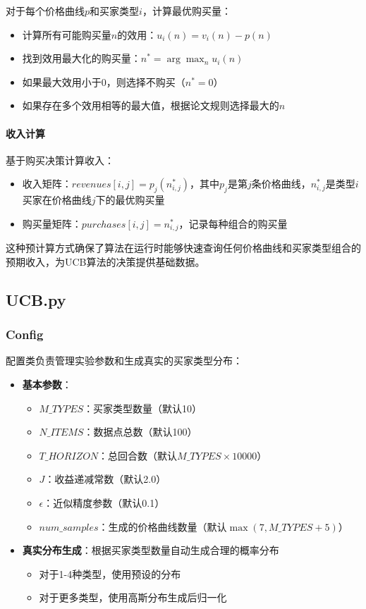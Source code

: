 对于每个价格曲线$p$和买家类型$i$，计算最优购买量：

\begin{itemize}
    \item 计算所有可能购买量$n$的效用：$u_i(n) = v_i(n) - p(n)$
    \item 找到效用最大化的购买量：$n^* = \arg\max_{n} u_i(n)$
    \item 如果最大效用小于0，则选择不购买（$n^* = 0$）
    \item 如果存在多个效用相等的最大值，根据论文规则选择最大的$n$
\end{itemize}

\paragraph{收入计算}

基于购买决策计算收入：

\begin{itemize}
    \item 收入矩阵：$revenues[i,j] = p_j(n^*_{i,j})$，其中$p_j$是第$j$条价格曲线，$n^*_{i,j}$是类型$i$买家在价格曲线$j$下的最优购买量
    \item 购买量矩阵：$purchases[i,j] = n^*_{i,j}$，记录每种组合的购买量
\end{itemize}

这种预计算方式确保了算法在运行时能够快速查询任何价格曲线和买家类型组合的预期收入，为UCB算法的决策提供基础数据。

\subsection{UCB.py}

\subsubsection{Config}

配置类负责管理实验参数和生成真实的买家类型分布：

\begin{itemize}
    \item \textbf{基本参数}：
    \begin{itemize}
        \item $M\_TYPES$：买家类型数量（默认10）
        \item $N\_ITEMS$：数据点总数（默认100）
        \item $T\_HORIZON$：总回合数（默认$M\_TYPES \times 10000$）
        \item $J$：收益递减常数（默认2.0）
        \item $\epsilon$：近似精度参数（默认0.1）
        \item $num\_samples$：生成的价格曲线数量（默认$\max(7, M\_TYPES + 5)$）
    \end{itemize}
    \item \textbf{真实分布生成}：根据买家类型数量自动生成合理的概率分布
    \begin{itemize}
        \item 对于1-4种类型，使用预设的分布
        \item 对于更多类型，使用高斯分布生成后归一化
    \end{itemize}
\end{itemize}

